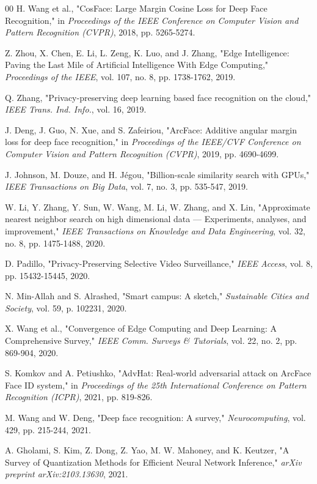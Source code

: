\documentclass[conference]{IEEEtran}
\begin{document}
\begin{thebibliography}{00}
 H. Wang et al., "CosFace: Large Margin Cosine Loss for Deep Face Recognition," in \textit{Proceedings of the IEEE Conference on Computer Vision and Pattern Recognition (CVPR)}, 2018, pp. 5265-5274.

 Z. Zhou, X. Chen, E. Li, L. Zeng, K. Luo, and J. Zhang, "Edge Intelligence: Paving the Last Mile of Artificial Intelligence With Edge Computing," \textit{Proceedings of the IEEE}, vol. 107, no. 8, pp. 1738-1762, 2019.

 Q. Zhang, "Privacy-preserving deep learning based face recognition on the cloud," \textit{IEEE Trans. Ind. Info.}, vol. 16, 2019.

 J. Deng, J. Guo, N. Xue, and S. Zafeiriou, "ArcFace: Additive angular margin loss for deep face recognition," in \textit{Proceedings of the IEEE/CVF Conference on Computer Vision and Pattern Recognition (CVPR)}, 2019, pp. 4690-4699.

 J. Johnson, M. Douze, and H. Jégou, "Billion-scale similarity search with GPUs," \textit{IEEE Transactions on Big Data}, vol. 7, no. 3, pp. 535-547, 2019.

 W. Li, Y. Zhang, Y. Sun, W. Wang, M. Li, W. Zhang, and X. Lin, "Approximate nearest neighbor search on high dimensional data — Experiments, analyses, and improvement," \textit{IEEE Transactions on Knowledge and Data Engineering}, vol. 32, no. 8, pp. 1475-1488, 2020.

 D. Padillo, "Privacy-Preserving Selective Video Surveillance," \textit{IEEE Access}, vol. 8, pp. 15432-15445, 2020.

 N. Min-Allah and S. Alrashed, "Smart campus: A sketch," \textit{Sustainable Cities and Society}, vol. 59, p. 102231, 2020.

 X. Wang et al., "Convergence of Edge Computing and Deep Learning: A Comprehensive Survey," \textit{IEEE Comm. Surveys \& Tutorials}, vol. 22, no. 2, pp. 869-904, 2020.

 S. Komkov and A. Petiushko, "AdvHat: Real-world adversarial attack on ArcFace Face ID system," in \textit{Proceedings of the 25th International Conference on Pattern Recognition (ICPR)}, 2021, pp. 819-826.

 M. Wang and W. Deng, "Deep face recognition: A survey," \textit{Neurocomputing}, vol. 429, pp. 215-244, 2021.

 A. Gholami, S. Kim, Z. Dong, Z. Yao, M. W. Mahoney, and K. Keutzer, "A Survey of Quantization Methods for Efficient Neural Network Inference," \textit{arXiv preprint arXiv:2103.13630}, 2021.


\end{thebibliography}
\end{document}
